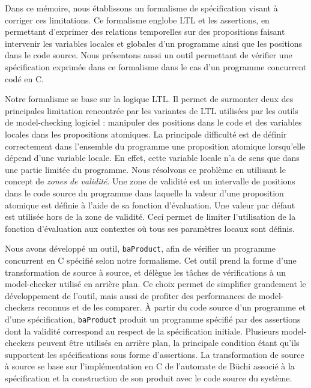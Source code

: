 Dans ce mémoire, nous établissons un formalisme de spécification visant à
corriger ces limitations. Ce formalisme englobe LTL et les assertions, en
permettant d'exprimer des relations temporelles sur des propositions faisant
intervenir les variables locales et globales d'un programme ainsi que les
positions dans le code source. Nous présentons aussi un outil permettant de
vérifier une spécification exprimée dans ce formalisme dans le cas d'un
programme concurrent codé en C.

Notre formalisme se base sur la logique LTL. Il permet de surmonter deux des
principales limitation rencontrée par les variantes de LTL utilisées par les
outils de model-checking logiciel : manipuler des positions dans le code et des
variables locales dans les propositions atomiques. La principale difficulté est
de définir correctement dans l'ensemble du programme une proposition atomique
lorsqu'elle dépend d'une variable locale. En effet, cette variable locale n'a de
sens que dans une partie limitée du programme. Nous résolvons ce problème en
utilisant le concept de \emph{zones de validité}. Une zone de validité est un
intervalle de positions dans le code source du programme dans laquelle la valeur
d'une proposition atomique est définie à l'aide de sa fonction d'évaluation.
Une valeur par défaut est utilisée hors de la zone de validité. Ceci permet de
limiter l'utilisation de la fonction d'évaluation aux contextes où tous ses
paramètres locaux sont définis.

Nous avons développé un outil, \texttt{baProduct}, afin de vérifier un programme
concurrent en C spécifié selon notre formalisme. Cet outil prend la forme d'une
transformation de source à source, et délègue les tâches de vérifications à un
model-checker utilisé en arrière plan. Ce choix permet de simplifier grandement
le développement de l'outil, mais aussi de profiter des performances de
model-checkers reconnus et de les comparer. À partir du code source d'un
programme et d'une spécification, \texttt{baProduct} produit un programme
spécifié par des assertions dont la validité correspond au respect de la
spécification initiale. Plusieurs model-checkers peuvent être utilisés en
arrière plan, la principale condition étant qu'ils supportent les spécifications
sous forme d'assertions. La transformation de source à source se base sur
l'implémentation en C de l'automate de Büchi associé à la spécification et la
construction de son produit avec le code source du système.

